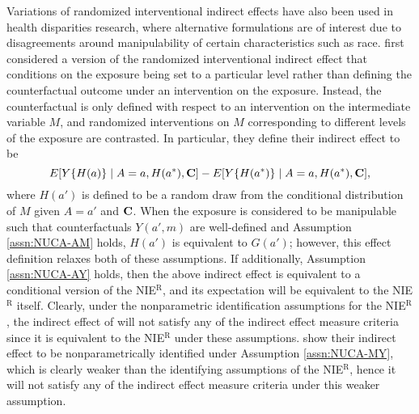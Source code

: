 \documentclass[12pt]{article}
\begin{document}
Variations of randomized interventional indirect effects have also been used in health disparities research, where alternative formulations are of interest due to disagreements around manipulability of certain characteristics such as race. \cite{vanderweele2014causal} first considered a version of the randomized interventional indirect effect that conditions on the exposure being set to a particular level rather than defining the counterfactual outcome under an intervention on the exposure. Instead, the counterfactual is only defined with respect to an intervention on the intermediate variable $M$, and randomized interventions on $M$ corresponding to different levels of the exposure are contrasted. In particular, they define their indirect effect to be 
\[E[Y\{H(a)\}\mid A=a, H(a^*), {\bf C}] - E[Y\{H(a^*)\}\mid A=a, H(a^*), {\bf C}],\]
where $H(a')$ is defined to be a random draw from the conditional distribution of $M$ given $A=a'$ and ${\bf C}$. When the exposure is considered to be manipulable such that counterfactuals $Y(a', m)$ are well-defined and Assumption \ref{assn:NUCA-AM} holds, $H(a')$ is equivalent to $G(a')$; however, this effect definition relaxes both of these assumptions. If additionally, Assumption \ref{assn:NUCA-AY} holds, then the above indirect effect is equivalent to a conditional version of the NIE$^{\text{R}}$, and its expectation will be equivalent to the NIE$^{\text{R}}$ itself. Clearly, under the nonparametric identification assumptions for the NIE$^{\text{R}}$, the indirect effect of \cite{vanderweele2014causal} will not satisfy any of the indirect effect measure criteria since it is equivalent to the NIE$^{\text{R}}$ under these assumptions. \cite{vanderweele2014causal} show their indirect effect to be nonparametrically identified under Assumption \ref{assn:NUCA-MY}, which is clearly weaker than the identifying assumptions of the NIE$^{\text{R}}$, hence it will not satisfy any of the indirect effect measure criteria under this weaker assumption. 
\end{document}
